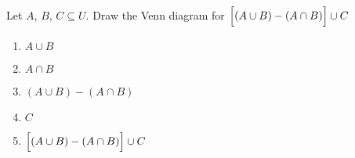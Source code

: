 \documentclass[../notes.tex]{subfiles}
\begin{document}
			\begin{examplebox}
				Let $A$, $B$, $C \subseteq U$. Draw the Venn diagram for $\Bigl[(A \cup B) - (A \cap B)\Bigr] \cup C$
				\begin{enumerate}
					\item $A \cup B$
						\begin{center}
							\begin{venndiagram3sets}[shade=circle area, tikzoptions={myvennoutline}, showframe=false]
								\fillA
								\fillB
							\end{venndiagram3sets}
						\end{center}
						\pagebreak
					\item $A \cap B$
						\begin{center}
							\begin{venndiagram3sets}[shade=circle area, tikzoptions={myvennoutline}, showframe=false]
								\fillACapB
							\end{venndiagram3sets}
						\end{center}
					\item $(A \cup B) - (A \cap B)$
						\begin{center}
							\begin{venndiagram3sets}[shade=circle area, tikzoptions={myvennoutline}, showframe=false]
								\fillANotB
								\fillBNotA
							\end{venndiagram3sets}
						\end{center}
					\item $C$
						\begin{center}
							\begin{venndiagram3sets}[shade=circle area, tikzoptions={myvennoutline}, showframe=false]
								\fillC
							\end{venndiagram3sets}
						\end{center}
						\pagebreak
					\item $\Bigl[(A \cup B) - (A \cap B)\Bigr] \cup C$
						\begin{center}
							\begin{venndiagram3sets}[shade=circle area, tikzoptions={myvennoutline}, showframe=false]
								\fillANotB
								\fillBNotA
								\fillC
							\end{venndiagram3sets}
						\end{center}
				\end{enumerate}
			\end{examplebox}
\end{document}
